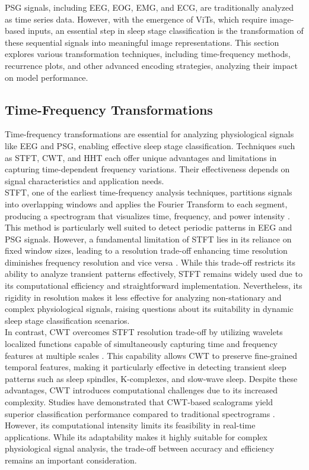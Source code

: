 PSG signals, including EEG, EOG, EMG, and ECG, are traditionally analyzed as time series data. However, with the emergence of ViTs, which require image-based inputs, an essential step in sleep stage classification is the transformation of these sequential signals into meaningful image representations. This section explores various transformation techniques, including time-frequency methods, recurrence plots, and other advanced encoding strategies, analyzing their impact on model performance.

\subsection{Time-Frequency Transformations}

Time-frequency transformations are essential for analyzing physiological signals like EEG and PSG, enabling effective sleep stage classification. Techniques such as \ac{STFT}, \ac{CWT}, and \ac{HHT} each offer unique advantages and limitations in capturing time-dependent frequency variations. Their effectiveness depends on signal characteristics and application needs. \\

STFT, one of the earliest time-frequency analysis techniques, partitions signals into overlapping windows and applies the Fourier Transform to each segment, producing a spectrogram that visualizes time, frequency, and power intensity \parencite{cohen2020time}. This method is particularly well suited to detect periodic patterns in EEG and PSG signals. However, a fundamental limitation of STFT lies in its reliance on fixed window sizes, leading to a resolution trade-off enhancing time resolution diminishes frequency resolution and vice versa \parencite{ali2024detection}. While this trade-off restricts its ability to analyze transient patterns effectively, STFT remains widely used due to its computational efficiency and straightforward implementation. Nevertheless, its rigidity in resolution makes it less effective for analyzing non-stationary and complex physiological signals, raising questions about its suitability in dynamic sleep stage classification scenarios. \\

In contrast, CWT overcomes STFT resolution trade-off by utilizing wavelets localized functions capable of simultaneously capturing time and frequency features at multiple scales \parencite{torrence1998practical}. This capability allows CWT to preserve fine-grained temporal features, making it particularly effective in detecting transient sleep patterns such as sleep spindles, K-complexes, and slow-wave sleep. Despite these advantages, CWT introduces computational challenges due to its increased complexity. Studies have  demonstrated that CWT-based scalograms yield superior classification performance compared to traditional spectrograms \parencite{schirrmeister2017deep}. However, its computational intensity limits its feasibility in real-time applications. While its adaptability makes it highly suitable for complex physiological signal analysis, the trade-off between accuracy and efficiency remains an important consideration. \\

